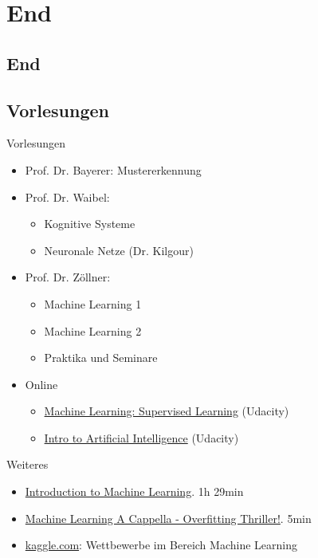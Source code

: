 \section*{End}
\subsection*{End}

\subsection{Vorlesungen}
\begin{frame}{Vorlesungen}
    \begin{itemize}
        \item Prof. Dr. Bayerer: Mustererkennung
        \item Prof. Dr. Waibel:
        \begin{itemize}
            \item Kognitive Systeme
            \item Neuronale Netze (Dr. Kilgour)
        \end{itemize}
        \item Prof. Dr. Zöllner:
        \begin{itemize}
            \item Machine Learning 1
            \item Machine Learning 2
            \item Praktika und Seminare
        \end{itemize}
        \item Online
        \begin{itemize}
            \item \href{https://www.udacity.com/course/machine-learning-supervised-learning--ud675}{Machine Learning: Supervised Learning} (Udacity)
            \item \href{https://www.udacity.com/course/intro-to-artificial-intelligence--cs271}{Intro to Artificial Intelligence} (Udacity)
        \end{itemize}
    \end{itemize}
\end{frame}

\begin{frame}{Weiteres}
    \begin{itemize}
        \item \href{http://videolectures.net/deeplearning2015_vincent_machine_learning/}{Introduction to Machine Learning}. 1h 29min
        \item \href{https://www.youtu.be.com/watch?v=DQWI1kvmwRg}{Machine Learning A Cappella - Overfitting Thriller!}. 5min
        \item \href{https://www.kaggle.com/}{kaggle.com}: Wettbewerbe im Bereich Machine Learning
    \end{itemize}
\end{frame}

